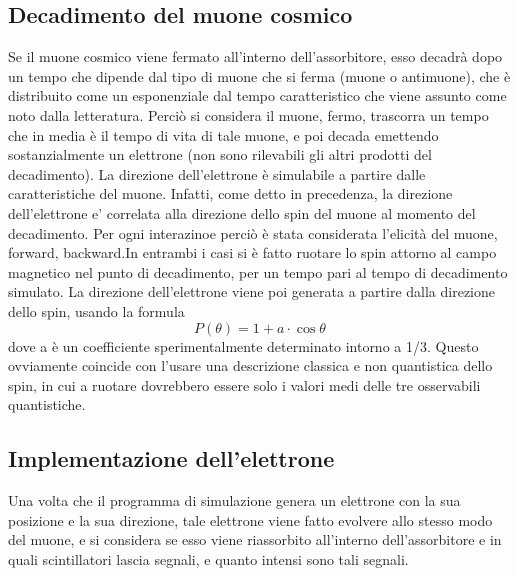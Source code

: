 \subsection{Decadimento del muone cosmico}
Se il muone cosmico viene fermato all'interno dell'assorbitore, esso decadrà dopo un tempo che dipende dal tipo di muone che si ferma (muone o antimuone), che è distribuito
come un esponenziale dal tempo caratteristico che viene assunto come noto dalla letteratura. Perciò si considera il muone, fermo, trascorra un tempo che in media è il tempo
di vita di tale muone, e poi decada emettendo sostanzialmente un elettrone (non sono rilevabili gli altri prodotti del decadimento). La direzione dell'elettrone \`e simulabile a partire dalle caratteristiche del muone. Infatti, come detto in precedenza, la direzione dell'elettrone e' correlata alla direzione dello spin del muone al momento del decadimento. Per ogni interazinoe perci\`o \`e stata considerata l'elicit\`a del muone, forward, backward.In entrambi i casi si \`e fatto ruotare lo spin attorno al campo magnetico nel punto di decadimento, per un tempo pari al tempo di decadimento simulato. La direzione dell'elettrone viene poi generata a partire dalla direzione dello spin, usando la formula 
\begin{equation}
	P(\theta) = 1+a\cdot\cos{\theta}
\end{equation}
dove a \`e un coefficiente sperimentalmente determinato intorno a 1/3. Questo ovviamente coincide con l'usare una descrizione classica e non quantistica dello spin, in cui a ruotare dovrebbero essere solo i valori medi delle tre osservabili quantistiche.

\subsection{Implementazione dell'elettrone}
Una volta che il programma di simulazione genera un elettrone con la sua posizione e la sua direzione, tale elettrone viene fatto evolvere allo stesso modo del muone, e si considera se esso viene riassorbito all'interno dell'assorbitore e in quali scintillatori lascia segnali, e quanto intensi sono tali segnali.

